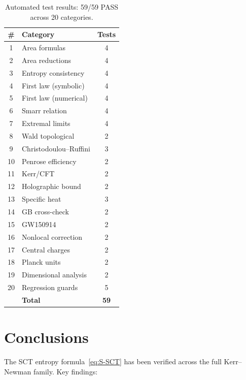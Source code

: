 \documentclass[11pt,a4paper]{article}
\begin{document}
\begin{table}[h]
\centering
\caption{Automated test results: 59/59 PASS across 20 categories.}
\label{tab:tests}
\begin{tabular}{clc}
\toprule
\# & Category & Tests \\
\midrule
1  & Area formulas & 4 \\
2  & Area reductions & 4 \\
3  & Entropy consistency & 4 \\
4  & First law (symbolic) & 4 \\
5  & First law (numerical) & 4 \\
6  & Smarr relation & 4 \\
7  & Extremal limits & 4 \\
8  & Wald topological & 2 \\
9  & Christodoulou--Ruffini & 3 \\
10 & Penrose efficiency & 2 \\
11 & Kerr/CFT & 2 \\
12 & Holographic bound & 2 \\
13 & Specific heat & 3 \\
14 & GB cross-check & 2 \\
15 & GW150914 & 2 \\
16 & Nonlocal correction & 2 \\
17 & Central charges & 2 \\
18 & Planck units & 2 \\
19 & Dimensional analysis & 2 \\
20 & Regression guards & 5 \\
\midrule
   & \textbf{Total} & \textbf{59} \\
\bottomrule
\end{tabular}
\end{table}

\section{Conclusions}\label{sec:conclusions}

The SCT entropy formula~\eqref{eq:S-SCT} has been verified across
the full Kerr--Newman family.  Key findings:
\end{document}

